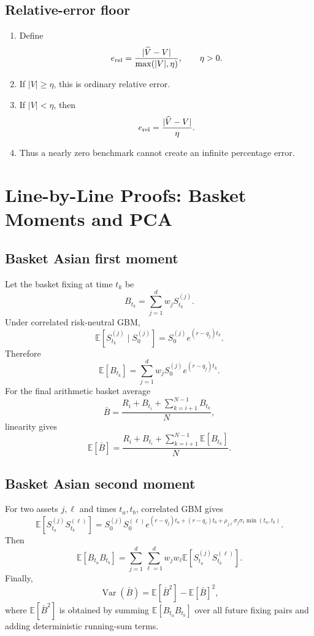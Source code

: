 \documentclass[11pt,oneside]{book}
\theoremstyle{definition}
\newenvironment{proofsteps}
{\begin{enumerate}[label=\textbf{Line \arabic*.}, itemsep=0.35em]}
{\end{enumerate}}
\newcommand{\E}{\mathbb{E}}
\newcommand{\Var}{\operatorname{Var}}
\begin{document}
\section{Relative-error floor}
\begin{proofsteps}
\item Define
\[
e_{\rm rel}=\frac{|\widehat V-V|}{\max(|V|,\eta)},\qquad \eta>0.
\]
\item If \(|V|\ge\eta\), this is ordinary relative error.
\item If \(|V|<\eta\), then
\[
e_{\rm rel}=\frac{|\widehat V-V|}{\eta}.
\]
\item Thus a nearly zero benchmark cannot create an infinite percentage error.
\end{proofsteps}

\chapter{Line-by-Line Proofs: Basket Moments and PCA}

\section{Basket Asian first moment}
Let the basket fixing at time \(t_k\) be
\[
  B_{t_k}=\sum_{j=1}^d w_j S_{t_k}^{(j)}.
\]
Under correlated risk-neutral GBM,
\[
  \E[S_{t_k}^{(j)}\mid S_0^{(j)}]
  =
  S_0^{(j)}e^{(r-q_j)t_k}.
\]
Therefore
\[
  \E[B_{t_k}]
  =
  \sum_{j=1}^d w_j S_0^{(j)}e^{(r-q_j)t_k}.
\]
For the final arithmetic basket average
\[
  \bar B=\frac{R_i+B_{t_i}+\sum_{k=i+1}^{N-1}B_{t_k}}{N},
\]
linearity gives
\[
  \E[\bar B]
  =
  \frac{R_i+B_{t_i}+\sum_{k=i+1}^{N-1}\E[B_{t_k}]}{N}.
\]

\section{Basket Asian second moment}
For two assets \(j,\ell\) and times \(t_a,t_b\), correlated GBM gives
\[
\E[S_{t_a}^{(j)}S_{t_b}^{(\ell)}]
=
S_0^{(j)}S_0^{(\ell)}
e^{(r-q_j)t_a+(r-q_\ell)t_b+\rho_{j\ell}\sigma_j\sigma_\ell\min(t_a,t_b)}.
\]
Then
\[
\E[B_{t_a}B_{t_b}]
=
\sum_{j=1}^d\sum_{\ell=1}^d
w_jw_\ell
\E[S_{t_a}^{(j)}S_{t_b}^{(\ell)}].
\]
Finally,
\[
\Var(\bar B)=\E[\bar B^2]-\E[\bar B]^2,
\]
where \(\E[\bar B^2]\) is obtained by summing \(\E[B_{t_a}B_{t_b}]\) over all future fixing pairs and adding deterministic running-sum terms.
\end{document}
